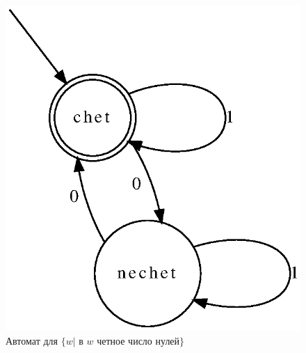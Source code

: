 \begin{figure}
    \centering
    \begin{minipage}{.5\textwidth}
      \centering
      \includegraphics[scale=0.7]{graphs/A.eps}
      \caption{Автомат для $\{w | \text{ в } w \text{ четное число нулей}\}$}
    \end{minipage}%
    \begin{minipage}{.5\textwidth}
      \centering

\end{minipage}
\end{figure}
